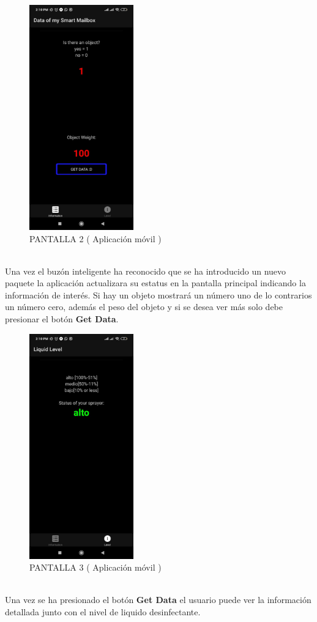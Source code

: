 \documentclass[osajnl,twocolumn,showpacs,superscriptaddress,10pt]{revtex4-1}
\begin{document}
\begin{figure} [H] \centering 
\caption{PANTALLA 2 ( Aplicación móvil )}
\includegraphics[width=0.4\textwidth]{img2.jpeg} 
\end{figure}
\\
Una vez el buzón inteligente ha reconocido que se ha introducido un nuevo paquete la aplicación actualizara su estatus en la pantalla principal indicando la información de interés. Si hay un objeto mostrará un número uno de lo contrarios un número cero, además el peso del objeto y si se desea ver más solo debe presionar el botón \textbf{Get Data}.

\begin{figure} [H] \centering 
\caption{PANTALLA 3 ( Aplicación móvil )}
\includegraphics[width=0.4\textwidth]{img3.jpeg} 
\end{figure}
\\
Una vez se ha presionado el botón \textbf{Get Data}  el usuario puede ver la información detallada junto con el nivel de liquido desinfectante.
\end{document}
